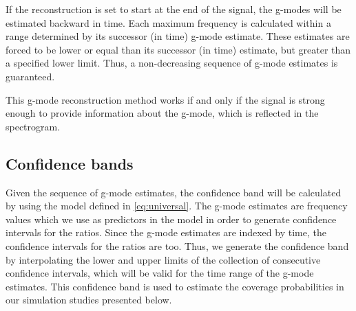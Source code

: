 If the reconstruction is set to start at the end of the signal, the g-modes will be estimated backward in time.  Each maximum frequency is calculated within a range determined by its successor (in time) g-mode estimate.  These estimates are forced to be lower or equal than its successor (in time) estimate, but greater than a specified lower limit. Thus, a non-decreasing sequence of g-mode estimates is guaranteed.

This g-mode reconstruction method works if and only if the signal is strong enough to provide information about the g-mode, which is reflected in the spectrogram.

\subsection{ Confidence bands}
Given the sequence of g-mode estimates, the confidence band will be calculated by using the model defined in \eqref{eq:universal}. The g-mode estimates are frequency values which we use as predictors in the model in order to generate confidence intervals for the ratios. Since the g-mode estimates are indexed by time, the confidence intervals for the ratios are too.  Thus, we generate the confidence band by interpolating the lower and upper limits of the collection of consecutive confidence intervals, which will be valid for the time range of the g-mode estimates.  This confidence band is used to estimate the coverage probabilities in our simulation studies presented below.  




